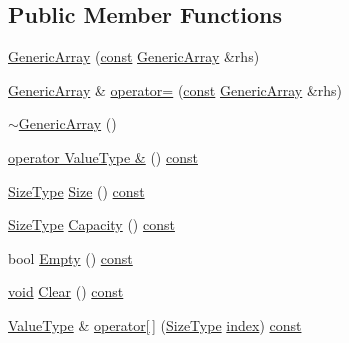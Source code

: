 \subsection*{Public Member Functions}
\begin{DoxyCompactItemize}
\item 
\hyperlink{classGenericArray_aa589d897a194b349d5053391a6f1491d}{Generic\+Array} (\hyperlink{classGenericArray_a25d2ed55daa117c41db6a5b3f87e9ddc}{const} \hyperlink{classGenericArray}{Generic\+Array} \&rhs)
\item 
\hyperlink{classGenericArray}{Generic\+Array} \& \hyperlink{classGenericArray_addbff152092d0998b2c550bd575f4b83}{operator=} (\hyperlink{classGenericArray_a25d2ed55daa117c41db6a5b3f87e9ddc}{const} \hyperlink{classGenericArray}{Generic\+Array} \&rhs)
\item 
\hyperlink{classGenericArray_a9c6b8f44efa60f720155f968b662e99e}{$\sim$\+Generic\+Array} ()
\item 
\hyperlink{classGenericArray_a28693c9c06b9e0445df7a5d9c4e8bb18}{operator Value\+Type \&} () \hyperlink{classGenericArray_a25d2ed55daa117c41db6a5b3f87e9ddc}{const}
\item 
\hyperlink{rapidjson_8h_a5ed6e6e67250fadbd041127e6386dcb5}{Size\+Type} \hyperlink{classGenericArray_a62d5b7f423edc2141cd4524c7dfd138b}{Size} () \hyperlink{classGenericArray_a25d2ed55daa117c41db6a5b3f87e9ddc}{const}
\item 
\hyperlink{rapidjson_8h_a5ed6e6e67250fadbd041127e6386dcb5}{Size\+Type} \hyperlink{classGenericArray_ab385434ab7a99de7a0a17e5ee7e09d7f}{Capacity} () \hyperlink{classGenericArray_a25d2ed55daa117c41db6a5b3f87e9ddc}{const}
\item 
bool \hyperlink{classGenericArray_af09e3aaeaeeb5fd825d79cc6663dfcf5}{Empty} () \hyperlink{classGenericArray_a25d2ed55daa117c41db6a5b3f87e9ddc}{const}
\item 
\hyperlink{imgui__impl__opengl3__loader_8h_ac668e7cffd9e2e9cfee428b9b2f34fa7}{void} \hyperlink{classGenericArray_a5e6c158ff76ab8a8ed568fa486e63c80}{Clear} () \hyperlink{classGenericArray_a25d2ed55daa117c41db6a5b3f87e9ddc}{const}
\item 
\hyperlink{classGenericArray_a93e53f38a99fc5167eb2a28653de64ed}{Value\+Type} \& \hyperlink{classGenericArray_aa185d997e7787e9b4f624d5de592b886}{operator\mbox{[}$\,$\mbox{]}} (\hyperlink{rapidjson_8h_a5ed6e6e67250fadbd041127e6386dcb5}{Size\+Type} \hyperlink{imgui__impl__opengl3__loader_8h_a57f14e05b1900f16a2da82ade47d0c6d}{index}) \hyperlink{classGenericArray_a25d2ed55daa117c41db6a5b3f87e9ddc}{const}

\end{DoxyCompactItemize}
